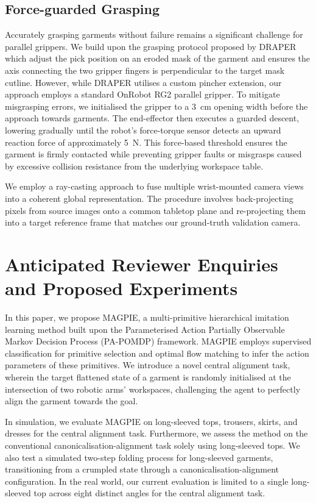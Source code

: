 \documentclass[journal]{IEEEtran}
\begin{document}
\subsection{Force-guarded Grasping} \label{sec:grasping}

Accurately grasping garments without failure remains a significant challenge for parallel grippers. We build upon the grasping protocol proposed by DRAPER \cite{kadi2025draper} which adjust the pick position on an eroded mask of the garment and ensures the axis connecting the two gripper fingers is perpendicular to the target mask cutline. However, while DRAPER utilises a custom pincher extension, our approach employs a standard OnRobot RG2 parallel gripper. To mitigate misgrasping errors, we initialised the gripper to a 3~cm opening width before the approach towards garments. The end-effector then executes a guarded descent, lowering gradually until the robot's force-torque sensor detects an upward reaction force of approximately 5~N. This force-based threshold ensures the garment is firmly contacted while preventing gripper faults or misgrasps caused by excessive collision resistance from the underlying workspace table.

We employ a ray-casting approach to fuse multiple wrist-mounted camera views into a coherent global representation. The procedure involves back-projecting pixels from source images onto a common tabletop plane and re-projecting them into a target reference frame that matches our ground-truth validation camera.

\newpage
\section{Anticipated Reviewer Enquiries and Proposed Experiments}

In this paper, we propose MAGPIE, a multi-primitive hierarchical imitation learning method built upon the Parameterised Action Partially Observable Markov Decision Process (PA-POMDP) framework. MAGPIE employs supervised classification for primitive selection and optimal flow matching to infer the action parameters of these primitives. We introduce a novel central alignment task, wherein the target flattened state of a garment is randomly initialised at the intersection of two robotic arms' workspaces, challenging the agent to perfectly align the garment towards the goal. 

In simulation, we evaluate MAGPIE on long-sleeved tops, trousers, skirts, and dresses for the central alignment task. Furthermore, we assess the method on the conventional canonicalisation-alignment task solely using long-sleeved tops. We also test a simulated two-step folding process for long-sleeved garments, transitioning from a crumpled state through a canonicalisation-alignment configuration. In the real world, our current evaluation is limited to a single long-sleeved top across eight distinct angles for the central alignment task.
\end{document}
